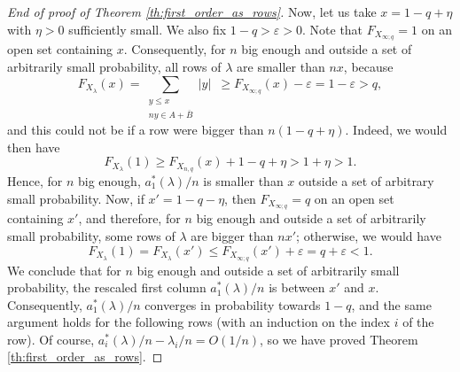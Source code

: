 \documentclass[10pt]{amsart}
\theoremstyle{remark}
\newcommand{\eps}{\varepsilon}
\begin{document}
\begin{proof}[End of proof of Theorem \ref{th:first_order_as_rows}]
Now, let us take $x=1-q+\eta$ with $\eta >0$ sufficiently small. We also fix $1-q>\eps>0$. Note that $F_{X_{\infty;q}}=1$ on an open set containing $x$. Consequently, for $n$ big enough and outside a set of arbitrarily small probability, all rows of $\lambda$ are smaller than $nx$, because
$$F_{X_\lambda}(x)=\sum_{\substack{y \leq x \\ ny \in A+\overline{B}}} \!\!\!\!|y|\,\,\, \geq F_{X_{\infty;q}}(x)-\eps = 1-\eps > q,$$
and this could not be if a row were bigger than $n(1-q+\eta)$. Indeed, we would then have
$$F_{X_\lambda}(1) \geq F_{X_{n,q}}(x)+1-q+\eta > 1+\eta>1.$$
Hence, for $n$ big enough, $a_1^*(\lambda)/n$ is smaller than $x$ outside a set of arbitrary small probability. Now, if $x'=1-q-\eta$, then $F_{X_{\infty;q}}=q$ on an open set containing $x'$, and therefore, for $n$ big enough and outside a set of arbitrarily small probability, some rows of $\lambda$ are bigger than $nx'$; otherwise, we would have $$F_{X_\lambda}(1)=F_{X_\lambda}(x')\leq F_{X_{\infty;q}}(x')+\eps= q+\eps <1.$$ We conclude that for $n$ big enough and outside a set of arbitrarily small probability, the rescaled first column $a_1^{*}(\lambda)/n$ is between $x'$ and $x$. Consequently, $a_1^*(\lambda)/n$ converges in probability towards $1-q$, and the same argument holds for the following rows (with an induction on the index $i$ of the row). Of course, $a_i^*(\lambda)/n-\lambda_i/n=O(1/n)$, so we have proved Theorem \ref{th:first_order_as_rows}. \end{proof}\bigskip
\end{document}
